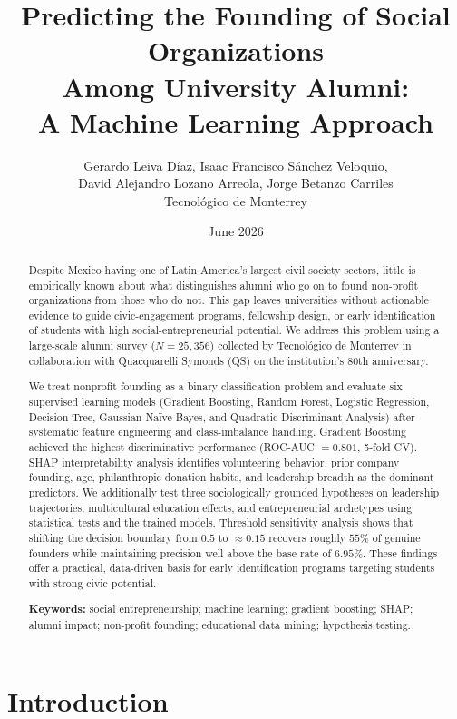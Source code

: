 \documentclass[10pt,twocolumn]{article}
\title{\textbf{Predicting the Founding of Social Organizations\\
Among University Alumni:\\
A Machine Learning Approach}}
\author{Gerardo Leiva Díaz, Isaac Francisco Sánchez Veloquio,\\
        David Alejandro Lozano Arreola, Jorge Betanzo Carriles\\
        \small Tecnológico de Monterrey}
\date{June 2026}
\begin{document}
\maketitle

\begin{abstract}
\noindent
Despite Mexico having one of Latin America's largest civil society sectors,
little is empirically known about what distinguishes alumni who go on to found
non-profit organizations from those who do not. This gap leaves universities
without actionable evidence to guide civic-engagement programs, fellowship
design, or early identification of students with high social-entrepreneurial
potential. We address this problem using a large-scale alumni survey
($N = 25{,}356$) collected by Tecnológico de Monterrey in collaboration with
Quacquarelli Symonds (QS) on the institution's 80th anniversary.

We treat nonprofit founding as a binary classification problem and evaluate
six supervised learning models (Gradient Boosting, Random Forest, Logistic
Regression, Decision Tree, Gaussian Naïve Bayes, and Quadratic Discriminant
Analysis) after systematic feature engineering and class-imbalance handling.
Gradient Boosting achieved the highest discriminative performance (ROC-AUC
$= 0.801$, 5-fold CV). SHAP interpretability analysis identifies volunteering
behavior, prior company founding, age, philanthropic donation habits, and
leadership breadth as the dominant predictors. We additionally test three
sociologically grounded hypotheses on leadership trajectories, multicultural
education effects, and entrepreneurial archetypes using statistical tests and
the trained models. Threshold sensitivity analysis shows that shifting the
decision boundary from $0.5$ to $\approx 0.15$ recovers roughly $55\%$ of
genuine founders while maintaining precision well above the base rate of
$6.95\%$. These findings offer a practical, data-driven basis for early
identification programs targeting students with strong civic potential.

\medskip
\noindent\textbf{Keywords:} social entrepreneurship; machine learning;
gradient boosting; SHAP; alumni impact; non-profit founding; educational
data mining; hypothesis testing.
\end{abstract}

\section{Introduction}
\end{document}
